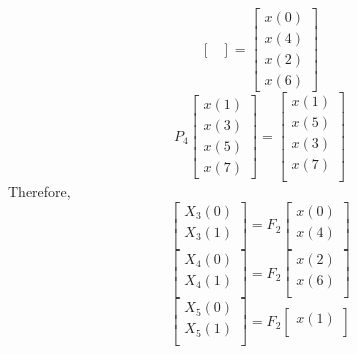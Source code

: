 \documentclass[journal,12pt,twocolumn]{IEEEtran}
\renewcommand\thesection{\arabic{section}}
\begin{document}
\begin{enumerate}[label=\thesection.\arabic*]
\begin{equation}
\begin{bmatrix}
	\end{bmatrix}
	= 
	\begin{bmatrix}
		x(0) \\ 
		x(4) \\ 
		x(2) \\
		x(6)
	\end{bmatrix}
\end{equation}
\begin{equation}
	P_{4}
	\begin{bmatrix}
		x(1) \\ 
		x(3) \\ 
		x(5) \\
		x(7)
	\end{bmatrix}
	= 
	\begin{bmatrix}
		x(1) \\ 
		x(5) \\ 
		x(3) \\ 
		x(7) \\
	\end{bmatrix}
\end{equation}
Therefore,
\begin{equation}
	\begin{bmatrix}
		X_{3}(0) \\ 
		X_{3}(1)\\ 
	\end{bmatrix}
	= F_{2}
	\begin{bmatrix}
		x(0) \\ 
		x(4) \\ 
	\end{bmatrix}
\end{equation}
\begin{equation}
	\begin{bmatrix}
		X_{4}(0) \\ 
		X_{4}(1)\\ 
	\end{bmatrix}
	= F_{2}
	\begin{bmatrix}
		x(2) \\ 
		x(6) \\ 
	\end{bmatrix}
\end{equation}
\begin{equation}
	\begin{bmatrix}
		X_{5}(0) \\ 
		X_{5}(1)\\ 
	\end{bmatrix}
	= F_{2}
	\begin{bmatrix}
		x(1) \\ 

\end{bmatrix}
\end{equation}
\end{enumerate}
\end{document}
